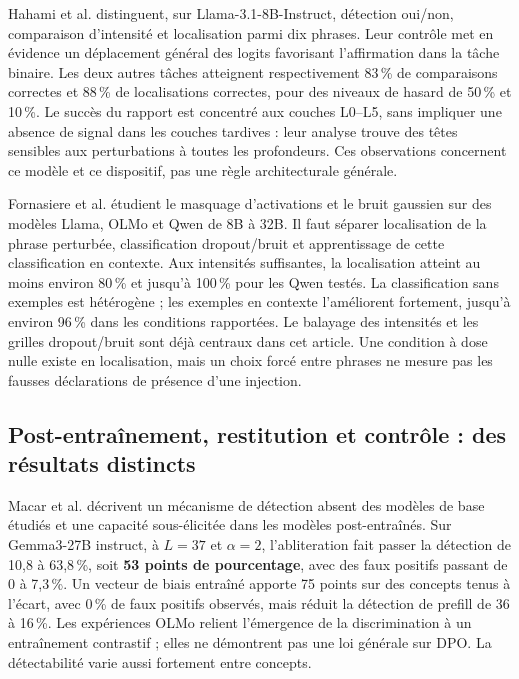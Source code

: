 \documentclass[10pt,a4paper]{article}
\begin{document}
Hahami et al. \cite{hahami2026} distinguent, sur Llama-3.1-8B-Instruct, détection oui/non, comparaison d'intensité et localisation parmi dix phrases. Leur contrôle met en évidence un déplacement général des logits favorisant l'affirmation dans la tâche binaire. Les deux autres tâches atteignent respectivement 83\,\% de comparaisons correctes et 88\,\% de localisations correctes, pour des niveaux de hasard de 50\,\% et 10\,\%. Le succès du rapport est concentré aux couches L0--L5, sans impliquer une absence de signal dans les couches tardives : leur analyse trouve des têtes sensibles aux perturbations à toutes les profondeurs. Ces observations concernent ce modèle et ce dispositif, pas une règle architecturale générale.

Fornasiere et al. \cite{fornasiere2026} étudient le masquage d'activations et le bruit gaussien sur des modèles Llama, OLMo et Qwen de 8B à 32B. Il faut séparer localisation de la phrase perturbée, classification dropout/bruit et apprentissage de cette classification en contexte. Aux intensités suffisantes, la localisation atteint au moins environ 80\,\% et jusqu'à 100\,\% pour les Qwen testés. La classification sans exemples est hétérogène ; les exemples en contexte l'améliorent fortement, jusqu'à environ 96\,\% dans les conditions rapportées. Le balayage des intensités et les grilles dropout/bruit sont déjà centraux dans cet article. Une condition à dose nulle existe en localisation, mais un choix forcé entre phrases ne mesure pas les fausses déclarations de présence d'une injection.

\subsection*{Post-entraînement, restitution et contrôle : des résultats distincts}

Macar et al. \cite{macar2026} décrivent un mécanisme de détection absent des modèles de base étudiés et une capacité sous-élicitée dans les modèles post-entraînés. Sur Gemma3-27B instruct, à $L=37$ et $\alpha=2$, l'abliteration fait passer la détection de 10,8 à 63,8\,\%, soit \textbf{53 points de pourcentage}, avec des faux positifs passant de 0 à 7,3\,\%. Un vecteur de biais entraîné apporte 75 points sur des concepts tenus à l'écart, avec 0\,\% de faux positifs observés, mais réduit la détection de prefill de 36 à 16\,\%. Les expériences OLMo relient l'émergence de la discrimination à un entraînement contrastif ; elles ne démontrent pas une loi générale sur DPO. La détectabilité varie aussi fortement entre concepts.
\end{document}
